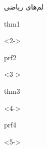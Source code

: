 \def\EMtitlesize{26}\def\EMtitleskip{31}
\begin{frame}{لم‌های ریاضی}
\begin{EMbox}{thm}{1}{}
\begin{uncoverenv}<2->
\end{uncoverenv}
\end{EMbox}
\begin{EMbox}{prf}{2}{}
\begin{uncoverenv}<3->
\end{uncoverenv}
\end{EMbox}
\begin{EMbox}{thm}{3}{}
\begin{uncoverenv}<4->
\end{uncoverenv}
\end{EMbox}
\begin{EMbox}{prf}{4}{}
\begin{uncoverenv}<5->
\end{uncoverenv}
\end{EMbox}
\end{frame}


